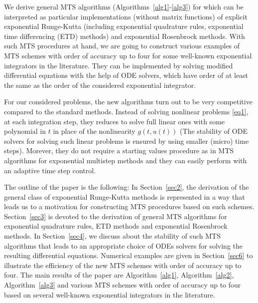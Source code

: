 We derive general MTS algorithms (Algorithms~\ref{alg1}-\ref{alg3}) for which can be interpreted as particular implementations (without matrix functions)  of explicit exponential Runge-Kutta (including exponential quadrature rules, exponential time differencing (ETD) methods) and exponential Rosenbrock methods. 
With such MTS procedures at hand, we are going to construct various examples of MTS schemes with order of accuracy up to four for some well-known exponential integrators in the literature.
They can be implemented by solving modified differential equations with the help of ODE solvers, which have order of at least the same as the order of the considered exponential integrator.

 For our considered problems, the new algorithms turn out to be very competitive compared to the standard methods.
Instead of solving nonlinear problems \eqref{eq1}, at each integration step, they reduces to solve full linear ones with some polynomial in $t$ in place of the nonlinearity $g(t,u(t))$ (The stability of  ODE solvers  for solving such linear problems is ensured by using smaller (micro) time steps). Morever, they do not require a starting values procedure as in MTS algorithms for exponential multistep methods and they can easily perform with an adaptive time step control. 

The outline of the paper is the following: In Section~\ref{sec2}, the derivation of the general class of exponential Runge-Kutta methods is represented in a way that leads us to a motivation for constructing MTS procedures based on such schemes. Section~\ref{sec3} is devoted to the derivation of general MTS algorithms for exponential quadrature rules,  ETD methods and exponential Rosenbrock methods. In Section~\ref{sec4}, we discuss about the stability of such MTS algorithms that leads to an appropriate choice of  ODEs solvers for solving the resulting differential equations.   
Numerical examples are given in Section~\ref{sec6} to illustrate the efficiency of the new MTS schemes with order of accuracy up to four.
The main results of the paper are Algorithm~\ref{alg1}, Algorithm~\ref{alg2}, Algorithm~\ref{alg3} and various MTS schemes with order of accuracy up to four based on several well-known exponential integrators in the literature.
